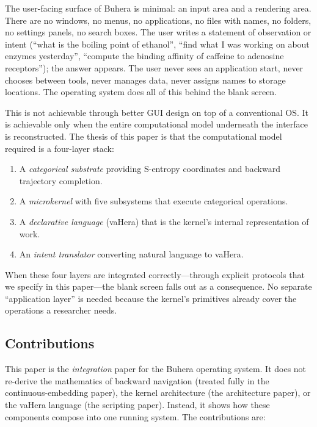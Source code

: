 \documentclass[11pt,twocolumn,a4paper]{article}
\begin{document}
The user-facing surface of Buhera is minimal: an input area and a rendering area. There are no windows, no menus, no applications, no files with names, no folders, no settings panels, no search boxes. The user writes a statement of observation or intent (``what is the boiling point of ethanol'', ``find what I was working on about enzymes yesterday'', ``compute the binding affinity of caffeine to adenosine receptors''); the answer appears. The user never sees an application start, never chooses between tools, never manages data, never assigns names to storage locations. The operating system does all of this behind the blank screen.

This is not achievable through better GUI design on top of a conventional OS. It is achievable only when the entire computational model underneath the interface is reconstructed. The thesis of this paper is that the computational model required is a four-layer stack:

\begin{enumerate}[leftmargin=*]
\item A \emph{categorical substrate} providing S-entropy coordinates and backward trajectory completion.
\item A \emph{microkernel} with five subsystems that execute categorical operations.
\item A \emph{declarative language} (vaHera) that is the kernel's internal representation of work.
\item An \emph{intent translator} converting natural language to vaHera.
\end{enumerate}

When these four layers are integrated correctly---through explicit protocols that we specify in this paper---the blank screen falls out as a consequence. No separate ``application layer'' is needed because the kernel's primitives already cover the operations a researcher needs.

\subsection{Contributions}

This paper is the \emph{integration} paper for the Buhera operating system. It does not re-derive the mathematics of backward navigation (treated fully in the continuous-embedding paper), the kernel architecture (the architecture paper), or the vaHera language (the scripting paper). Instead, it shows how these components compose into one running system. The contributions are:
\end{document}
